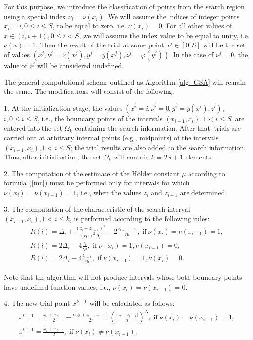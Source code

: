 \documentclass[preprint,12pt]{elsarticle}
\begin{document}
For this purpose, we introduce the classification of points from the search region using a special index $\nu_i=\nu(x_i)$. We will assume the indices of integer points $x_i = i, 0\leq i \leq S$, to be equal to zero, i.e. $\nu(x_i) = 0$. For all other values of $x\in(i,i+1),  0 \leq i < S$, we will assume the index value to be equal to unity, i.e.  $\nu(x) = 1$. Then the result of the trial at some point $x^j\in[0,S]$  will be the set of values $(x^j, \nu^j=\nu(x^j), y^j=y(x^j), z^j = \varphi(y^j))$. In the case of  $\nu^j=0$, the value of $z^j$ will be considered undefined.

The general computational scheme outlined as Algorithm \ref{alg_GSA} will remain the same. The modifications will consist of the following.

1. At the initialization stage, the values $(x^i = i, \nu^i=0, y^i=y(x^i), z^i)$, $ i, 0\leq i \leq S$, i.e., the boundary points of the intervals $(x_{i-1},x_i), 1<i\leq S$, are entered into the set $\Omega_k$ containing the search  information. 
After that, trials are carried out at arbitrary internal points (e.g., midpoints) of the intervals $(x_{i-1},x_i), 1<i\leq S$; the trial results are also added to the search information. Thus, after initialization, the set $\Omega_k$ will contain $k=2S+1$ elements.

2. The computation of the estimate of the H\"older constant $\mu$ according to formula (\ref{mu}) must be performed only for intervals for which $\nu(x_i) = \nu(x_{i-1}) = 1$, i.e., when the values $z_i$ and $z_{i-1}$ are determined.

3. The computation of the characteristic of the search interval $(x_{i-1},x_i), 1<i\leq k$, is performed according to the following rules:
\begin{gather}\label{R_int}
R(i) = \Delta_i + \frac{(z_i-z_{i-1})^2}{(r\mu)^2\Delta_i}-2\frac{z_{i-1}+z_i}{r\mu}, \; \mathrm{if} \; \nu(x_i) = \nu(x_{i-1}) = 1, \nonumber \\ 
R(i) = 2\Delta_i-4\frac{z_i}{r\mu}, \; \mathrm{if} \;  \nu(x_i) = 1, \nu(x_{i-1}) = 0, \nonumber \\ 
R(i) = 2\Delta_i-4\frac{z_{i-1}}{r\mu}, \; \mathrm{if} \;  \nu(x_{i-1}) = 1, \nu(x_{i}) = 0. \nonumber
\end{gather}

Note that the algorithm will not produce intervals whose both boundary points have undefined function values, i.e., $\nu(x_i) = \nu(x_{i-1}) = 0$.

4. The new trial point $x^{k+1}$ will be calculated as follows:
\begin{gather}\label{xk1_int}
x^{k+1} = \frac{x_t+x_{t-1}}{2}- \frac{\mathrm{sign}(z_t-z_{t-1})}{2r} \left(\frac{\left|z_t-z_{t-1}\right|}{\mu}\right)^N, \; \mathrm{if} \; \nu(x_i) = \nu(x_{i-1}) = 1, \nonumber \\    
x^{k+1} = \frac{x_t+x_{t-1}}{2} , \; \mathrm{if} \; \nu(x_i) \neq \nu(x_{i-1}). \nonumber
\end{gather}
\end{document}
